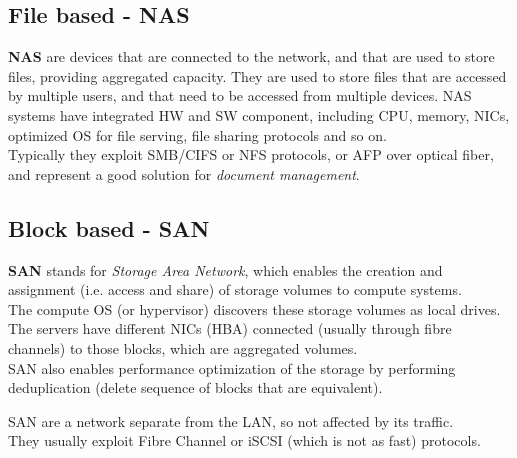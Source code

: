 
\subsection{File based - NAS}
\textbf{NAS} are devices that are connected to the network, and that are used to store files, providing aggregated capacity. They are used to store files that are accessed by multiple users, and that need to be accessed from multiple devices.
NAS systems have integrated HW and SW component, including CPU, memory, NICs, optimized OS for file serving, file sharing protocols and so on.\\
Typically they exploit SMB/CIFS or NFS protocols, or AFP over optical fiber, and represent a good solution for \textit{document management}.

\subsection{Block based - SAN}
\textbf{SAN} stands for \textit{Storage Area Network}, which enables the creation and assignment (i.e. access and share) of storage volumes to compute systems.\\
The compute OS (or hypervisor) discovers these storage volumes as local drives.
The servers have different NICs (HBA) connected (usually through
fibre channels) to those blocks, which are aggregated volumes.\\
SAN also enables performance optimization of the storage by performing
deduplication (delete sequence of blocks that are equivalent).


SAN are a network separate from the LAN, so not affected by its traffic.\\
They usually exploit Fibre Channel or iSCSI (which is not as fast) protocols.


